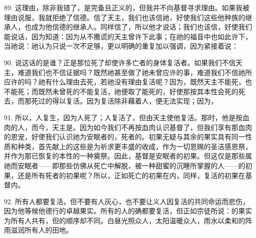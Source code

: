 89. 这理由，除非我错了，是完备且正义的，但我并不向基督寻求理由。如果我被理由说服，我就拒绝了信德。信了天主，我们也该信祂，好使我们这些他种族的继承人，也成为他信德的继承人。同样信了，所以他才说话；我们也该信，好使我们能说话，因为知道：因为从不撒谎的天主曾许下此事；在祂的福音中也如此许下，当祂说：祂认为只说一次不足够，更以明确的重复加以强调，因为紧接着说：\par

90. 说这话的是谁？正是那位死了却使许多亡者的身体复活者。如果我们不信天主，难道我们也不信证据吗？既然祂甚至做了祂未曾应许的事，难道我们不信祂所应许的吗？祂有什么理由去死，若祂没有理由复活呢？因为，既然天主不能死，也不能死；而既然未曾死的不能复活，祂便取了能死的，好使那按其本性会死的死去，而那死过的得以复活。因为复活除非藉着人，便无法实现；因为，\par

91. 所以，人复生，因为人死了；人复活了，但由天主使他复活。那时，他是按血肉的人，而今，天主是。因为如今我们不再按血肉认识基督了，但我们享有那血肉的恩宠，好使我们认识祂为安眠者的，死者的。初果无疑与其余的果实具有同一性质和种类，首先献上的这些是为祈求更丰盛的收成，作为一切恩赐的圣洁感恩祭，并作为那已恢复的本性的一种奠祭。因此，基督是安眠者的初果。但这仅是那些属祂而安眠者——即那些仿佛从死亡中解脱，被一种甜蜜的沉睡所掌握的人——的初果，还是所有死者的初果呢？所以，正如死亡的初果在内，同样，复活的初果在基督内。\par

92. 所有人都要复活，但不要有人灰心，也不要让义人因复活的共同命运而悲伤，因为他等候他德行的卓越果实。所有的人的确都要复活，但正如宗徒所说：的果实为所有人共有，但的顺序却不同。白昼光照众人，太阳温暖众人，雨水以柔和的阵雨滋润所有人的田地。\par

